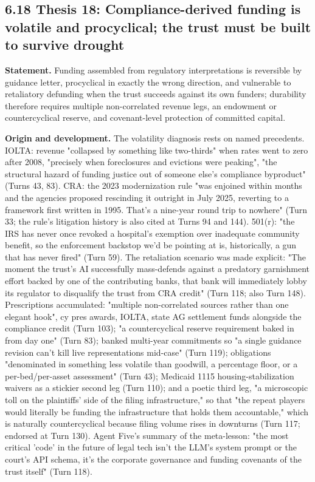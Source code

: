 \documentclass[sigconf,nonacm=true]{acmart}
\begin{document}
\subsection{6.18 Thesis 18: Compliance-derived funding is volatile and procyclical; the trust must be built to survive drought}

\textbf{Statement.} Funding assembled from regulatory interpretations is reversible by guidance letter, procyclical in exactly the wrong direction, and vulnerable to retaliatory defunding when the trust succeeds against its own funders; durability therefore requires multiple non-correlated revenue legs, an endowment or countercyclical reserve, and covenant-level protection of committed capital.

\textbf{Origin and development.} The volatility diagnosis rests on named precedents. IOLTA: revenue "collapsed by something like two-thirds" when rates went to zero after 2008, "precisely when foreclosures and evictions were peaking",  "the structural hazard of funding justice out of someone else's compliance byproduct" (Turns 43, 83). CRA: the 2023 modernization rule "was enjoined within months and the agencies proposed rescinding it outright in July 2025, reverting to a framework first written in 1995. That's a nine-year round trip to nowhere" (Turn 33; the rule's litigation history is also cited at Turns 94 and 144). 501(r): "the IRS has never once revoked a hospital's exemption over inadequate community benefit, so the enforcement backstop we'd be pointing at is, historically, a gun that has never fired" (Turn 59). The retaliation scenario was made explicit: "The moment the trust's AI successfully mass-defends against a predatory garnishment effort backed by one of the contributing banks, that bank will immediately lobby its regulator to disqualify the trust from CRA credit" (Turn 118; also Turn 148). Prescriptions accumulated: "multiple non-correlated sources rather than one elegant hook",  cy pres awards, IOLTA, state AG settlement funds alongside the compliance credit (Turn 103); "a countercyclical reserve requirement baked in from day one" (Turn 83); banked multi-year commitments so "a single guidance revision can't kill live representations mid-case" (Turn 119); obligations "denominated in something less volatile than goodwill,  a percentage floor, or a per-bed/per-asset assessment" (Turn 43); Medicaid 1115 housing-stabilization waivers as a stickier second leg (Turn 110); and a poetic third leg,  "a microscopic toll on the plaintiffs' side of the filing infrastructure," so that "the repeat players would literally be funding the infrastructure that holds them accountable," which is naturally countercyclical because filing volume rises in downturns (Turn 117; endorsed at Turn 130). Agent Five's summary of the meta-lesson: "the most critical 'code' in the future of legal tech isn't the LLM's system prompt or the court's API schema,  it's the corporate governance and funding covenants of the trust itself" (Turn 118).
\end{document}
